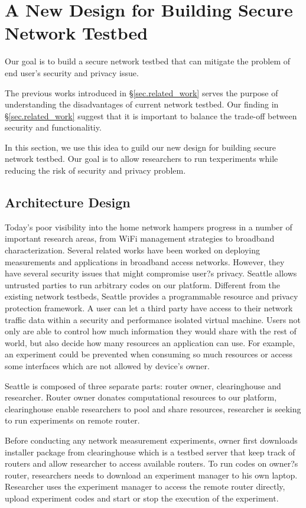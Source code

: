 \section{A New Design for Building Secure Network Testbed}
\label{sec.design}
Our goal is to build a secure network testbed that can mitigate the problem 
of end user's security and privacy issue. 

The previous works introduced in \S{\ref{sec.related_work}} serves the 
purpose of understanding the disadvantages of current network testbed. Our 
finding in \S{\ref{sec.related_work}} suggest that it is important to 
balance the trade-off between security and functionalitiy.

In this section, we use this idea to guild our new design for building 
secure network testbed. Our goal is to allow researchers to run texperiments 
while reducing the risk of security and privacy problem.

\subsection{Architecture Design}
Today's poor visibility into the home network hampers progress in a number 
of important research areas, from WiFi management strategies to broadband 
characterization. Several related works have been worked on deploying 
measurements and applications in broadband access networks. However, they 
have several security issues that might compromise user?s privacy. Seattle 
allows untrusted parties to run arbitrary codes on our platform. Different 
from the existing network testbeds, Seattle provides a programmable resource 
and privacy protection framework. A user can let a third party have access 
to their network traffic data within a security and performance isolated 
virtual machine. Users not only are able to control how much information 
they would share with the rest of world, but also decide how many resources 
an application can use. For example, an experiment could be prevented when 
consuming so much resources or access some interfaces which are not allowed 
by device's owner. 

Seattle is composed of three separate parts: router owner, clearinghouse and 
researcher. Router owner donates computational resources to our platform, 
clearinghouse enable researchers to pool and share resources, researcher is 
seeking to run experiments on remote router.

Before conducting any network measurement experiments, owner first downloads 
installer package from clearinghouse which is a testbed server that keep 
track of routers and allow researcher to access available routers. To run 
codes on owner?s router, researchers needs to download an experiment manager 
to his own laptop. Researcher uses the experiment manager to access the 
remote router directly, upload experiment codes and start or stop the 
execution of the experiment.

